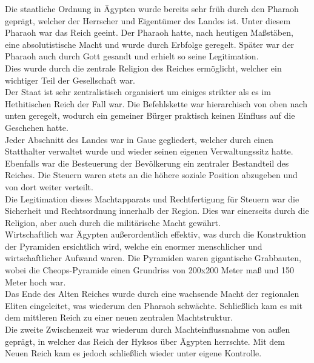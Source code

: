 \documentclass{article}
\begin{document}
	Die staatliche Ordnung in Ägypten wurde bereits sehr früh durch den Pharaoh geprägt, welcher der Herrscher und Eigentümer des Landes ist. Unter diesem Pharaoh war das Reich geeint. Der Pharaoh hatte, nach heutigen Maßstäben, eine absolutistische Macht und wurde durch Erbfolge geregelt. Später war der Pharaoh auch durch Gott gesandt und erhielt so seine Legitimation. \\
	Dies wurde durch die zentrale Religion des Reiches ermöglicht, welcher ein wichtiger Teil der Gesellschaft war. \\
	Der Staat ist sehr zentralistisch organisiert um einiges strikter als es im Hethitischen Reich der Fall war. Die Befehlskette war hierarchisch von oben nach unten geregelt, wodurch ein gemeiner Bürger praktisch keinen Einfluss auf die Geschehen hatte. \\
	Jeder Abschnitt des Landes war in Gaue gegliedert, welcher durch einen Statthalter verwaltet wurde und wieder seinen eigenen Verwaltungssitz hatte. \\
	Ebenfalls war die Besteuerung der Bevölkerung ein zentraler Bestandteil des Reiches. Die Steuern waren stets an die höhere soziale Position abzugeben und von dort weiter verteilt. \\
	Die Legitimation dieses Machtapparats und Rechtfertigung für Steuern war die Sicherheit und Rechtsordnung innerhalb der Region. Dies war einerseits durch die Religion, aber auch durch die militärische Macht gewährt. \\
	Wirtschaftlich war Ägypten außerordentlich effektiv, was durch die Konstruktion der Pyramiden ersichtlich wird, welche ein enormer menschlicher und wirtschaftlicher Aufwand waren. Die Pyramiden waren gigantische Grabbauten, wobei die Cheops-Pyramide einen Grundriss von 200x200 Meter maß und 150 Meter hoch war. \\
	Das Ende des Alten Reiches wurde durch eine wachsende Macht der regionalen Eliten eingeleitet, was wiederum den Pharaoh schwächte. Schließlich kam es mit dem mittleren Reich zu einer neuen zentralen Machtstruktur. \\
	Die zweite Zwischenzeit war wiederum durch Machteinflussnahme von außen geprägt, in welcher das Reich der Hyksos über Ägypten herrschte. Mit dem Neuen Reich kam es jedoch schließlich wieder unter eigene Kontrolle. \\
	
\end{document}
